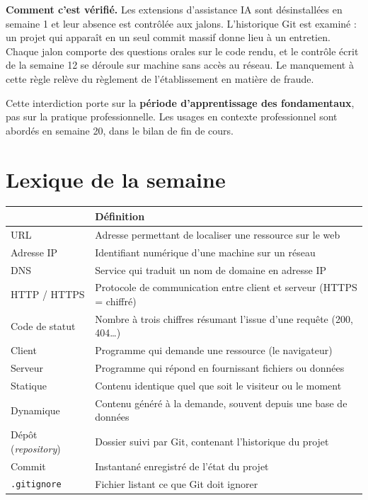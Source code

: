\documentclass[a4paper,11pt]{article}
\newcommand{\hdr}[1]{\multicolumn{1}{l}{\color{white}\bfseries #1}}
\renewcommand{\arraystretch}{1.3}
\begin{document}
\vspace{4pt}
\textbf{Comment c'est vérifié.} Les extensions d'assistance IA sont désinstallées en semaine 1 et leur absence est contrôlée aux jalons. L'historique Git est examiné : un projet qui apparaît en un seul commit massif donne lieu à un entretien. Chaque jalon comporte des questions orales sur le code rendu, et le contrôle écrit de la semaine 12 se déroule sur machine sans accès au réseau. Le manquement à cette règle relève du règlement de l'établissement en matière de fraude.

\begin{tcolorbox}[astuce, title={Pour être clair}]
Cette interdiction porte sur la \textbf{période d'apprentissage des fondamentaux}, pas sur la pratique professionnelle. Les usages en contexte professionnel sont abordés en semaine 20, dans le bilan de fin de cours.
\end{tcolorbox}

\section{Lexique de la semaine}

\begin{center}
\renewcommand{\arraystretch}{1.0}
\begin{tabularx}{\linewidth}{p{4cm}X}
  \toprule
  \rowcolor{uniNavy}
  \hdr{Terme} &  \hdr{Définition} \\
  \midrule
  \rowcolor{uniPaper}
  URL & Adresse permettant de localiser une ressource sur le web \\
  Adresse IP & Identifiant numérique d'une machine sur un réseau \\
  \rowcolor{uniPaper}
  DNS & Service qui traduit un nom de domaine en adresse IP \\
  HTTP / HTTPS & Protocole de communication entre client et serveur (HTTPS = chiffré) \\
  \rowcolor{uniPaper}
  Code de statut & Nombre à trois chiffres résumant l'issue d'une requête (200, 404\ldots) \\
  Client & Programme qui demande une ressource (le navigateur) \\
  \rowcolor{uniPaper}
  Serveur & Programme qui répond en fournissant fichiers ou données \\
  Statique & Contenu identique quel que soit le visiteur ou le moment \\
  \rowcolor{uniPaper}
  Dynamique & Contenu généré à la demande, souvent depuis une base de données \\
  Dépôt (\textit{repository}) & Dossier suivi par Git, contenant l'historique du projet \\
  \rowcolor{uniPaper}
  Commit & Instantané enregistré de l'état du projet \\
  \texttt{.gitignore} & Fichier listant ce que Git doit ignorer \\
  \bottomrule
\end{tabularx}
\end{center}
\end{document}
